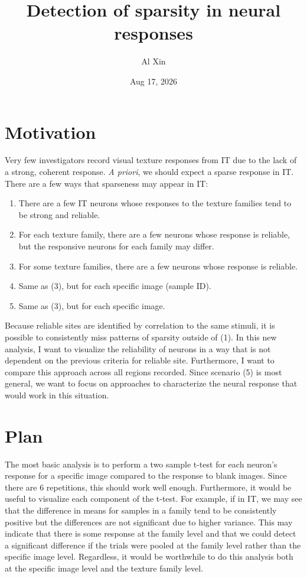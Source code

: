 \documentclass[
  10pt,
  letterpaper,
  DIV=11,
  numbers=noendperiod]{scrartcl}
\title{Detection of sparsity in neural responses}
\author{\small Al Xin}
\date{Aug 17, 2026}
\providecommand{\tightlist}{%
  \setlength{\itemsep}{0pt}\setlength{\parskip}{0pt}}
\begin{document}
\maketitle


\section{Motivation}\label{motivation}

Very few investigators record visual texture responses from IT due to
the lack of a strong, coherent response. \emph{A priori}, we should
expect a sparse response in IT. There are a few ways that sparseness may
appear in IT:

\begin{enumerate}
\def\labelenumi{\arabic{enumi}.}
\tightlist
\item
  There are a few IT neurons whose responses to the texture families
  tend to be strong and reliable.
\item
  For each texture family, there are a few neurons whose response is
  reliable, but the responsive neurons for each family may differ.
\item
  For some texture families, there are a few neurons whose response is
  reliable.
\item
  Same as (3), but for each specific image (sample ID).
\item
  Same as (3), but for each specific image.
\end{enumerate}

Because reliable sites are identified by correlation to the same
stimuli, it is possible to consistently miss patterns of sparsity
outside of (1). In this new analysis, I want to visualize the
reliability of neurons in a way that is not dependent on the previous
criteria for reliable site. Furthermore, I want to compare this approach
across all regions recorded. Since scenario (5) is most general, we want
to focus on approaches to characterize the neural response that would
work in this situation.

\section{Plan}\label{plan}

The most basic analysis is to perform a two sample t-test for each
neuron's response for a specific image compared to the response to blank
images. Since there are 6 repetitions, this should work well enough.
Furthermore, it would be useful to visualize each component of the
t-test. For example, if in IT, we may see that the difference in means
for samples in a family tend to be consistently positive but the
differences are not significant due to higher variance. This may
indicate that there is some response at the family level and that we
could detect a significant difference if the trials were pooled at the
family level rather than the specific image level. Regardless, it would
be worthwhile to do this analysis both at the specific image level and
the texture family level.
\end{document}
